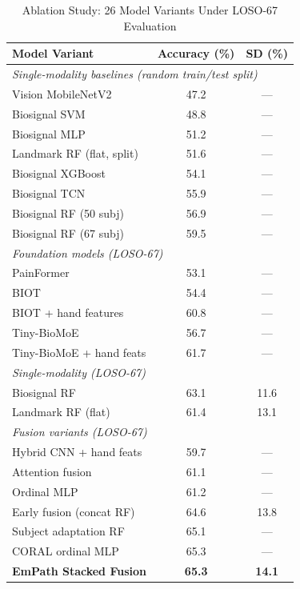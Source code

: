 \documentclass[10pt, twocolumn]{article}
\begin{document}
\begin{table}[t]
\centering
\caption{Ablation Study: 26 Model Variants Under LOSO-67 Evaluation}
\label{tab:ablation}
\small
\begin{tabular}{lcc}
\toprule
\textbf{Model Variant} & \textbf{Accuracy (\%)} & \textbf{SD (\%)} \\
\midrule
\multicolumn{3}{l}{\textit{Single-modality baselines (random train/test split)}} \\
Vision MobileNetV2        & 47.2 & --- \\
Biosignal SVM             & 48.8 & --- \\
Biosignal MLP             & 51.2 & --- \\
Landmark RF (flat, split) & 51.6 & --- \\
Biosignal XGBoost         & 54.1 & --- \\
Biosignal TCN             & 55.9 & --- \\
Biosignal RF (50 subj)    & 56.9 & --- \\
Biosignal RF (67 subj)    & 59.5 & --- \\
\midrule
\multicolumn{3}{l}{\textit{Foundation models (LOSO-67)}} \\
PainFormer                & 53.1 & --- \\
BIOT                      & 54.4 & --- \\
BIOT + hand features      & 60.8 & --- \\
Tiny-BioMoE               & 56.7 & --- \\
Tiny-BioMoE + hand feats  & 61.7 & --- \\
\midrule
\multicolumn{3}{l}{\textit{Single-modality (LOSO-67)}} \\
Biosignal RF              & 63.1 & 11.6 \\
Landmark RF (flat)        & 61.4 & 13.1 \\
\midrule
\multicolumn{3}{l}{\textit{Fusion variants (LOSO-67)}} \\
Hybrid CNN + hand feats   & 59.7 & --- \\
Attention fusion          & 61.1 & --- \\
Ordinal MLP               & 61.2 & --- \\
Early fusion (concat RF)  & 64.6 & 13.8 \\
Subject adaptation RF     & 65.1 & --- \\
CORAL ordinal MLP         & 65.3 & --- \\
\textbf{EmPath Stacked Fusion} & \textbf{65.3} & \textbf{14.1} \\

\end{tabular}
\end{table}
\end{document}
